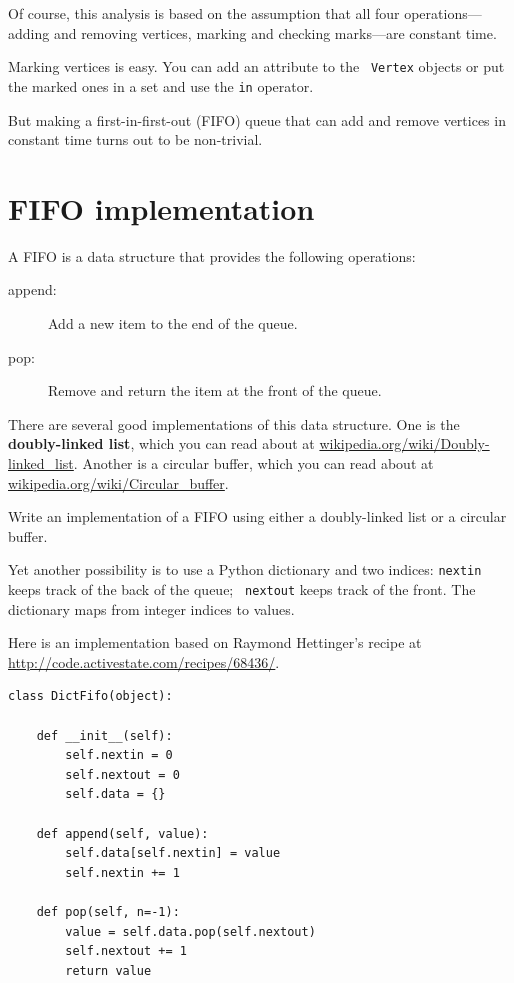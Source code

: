 \documentclass[10pt]{book}
\begin{document}
Of course, this analysis is based on the assumption that all four
operations---adding and removing vertices, marking and checking
marks---are constant time.

Marking vertices is easy.  You can add an attribute to the {\tt
  Vertex} objects or put the marked ones in a set and use
the {\tt in} operator.

But making a first-in-first-out (FIFO) queue that can add and remove
vertices in constant time turns out to be non-trivial.


\section{FIFO implementation}

A FIFO is a data structure that provides the following operations:

\begin{description}

\item[append:] Add a new item to the end of the queue.

\item[pop:] Remove and return the item at the front of the queue.

\end{description}

There are several good implementations of this data structure.
One is the {\bf doubly-linked list}, which 
you can read about at \url{wikipedia.org/wiki/Doubly-linked_list}.
Another is a circular buffer, which you can read about at
\url{wikipedia.org/wiki/Circular_buffer}.

\begin{ex}

Write an implementation of a FIFO using either a doubly-linked
list or a circular buffer.

\end{ex}

Yet another possibility is to use a Python dictionary and
two indices: {\tt nextin} keeps track of the back of the queue; {\tt
  nextout} keeps track of the front.  The dictionary maps from
integer indices to values.

Here is an implementation based on Raymond Hettinger's recipe
at \url{http://code.activestate.com/recipes/68436/}.

\begin{verbatim}
class DictFifo(object):

    def __init__(self):
        self.nextin = 0
        self.nextout = 0
        self.data = {}

    def append(self, value):
        self.data[self.nextin] = value
        self.nextin += 1

    def pop(self, n=-1):
        value = self.data.pop(self.nextout)
        self.nextout += 1
        return value
\end{verbatim}
\end{document}
